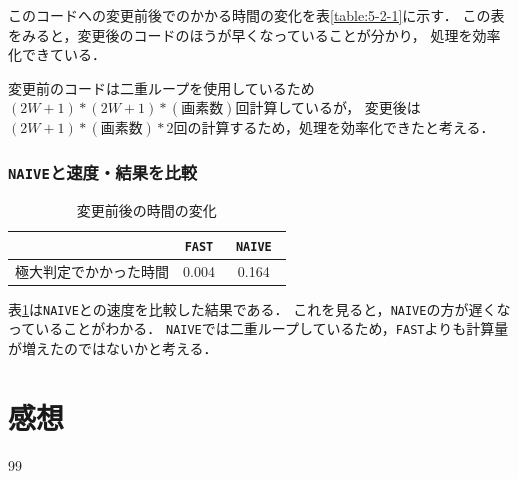 \documentclass[autodetect-engine,dvi=dvipdfmx,ja=standard,
               a4j,11pt]{bxjsarticle}
\begin{document}
このコードへの変更前後でのかかる時間の変化を表\ref{table:5-2-1}に示す．
この表をみると，変更後のコードのほうが早くなっていることが分かり，
処理を効率化できている．

変更前のコードは二重ループを使用しているため$(2W+1)*(2W+1)*(画素数)$回計算しているが，
変更後は$(2W+1)*(画素数)*2$回の計算するため，処理を効率化できたと考える．


\subsubsection{\texttt{NAIVE}と速度・結果を比較}

\begin{table}[htbp]
\centering
\caption{変更前後の時間の変化}\label{table:5-2-2}
\begin{tabular}{|c||c|c|}
\hline
 & \texttt{FAST} & \texttt{NAIVE}　\\
\hline
極大判定でかかった時間 & 0.004 & 0.164 \\
\hline
\end{tabular}\end{table}

表\ref{table:5-2-2}は\verb|NAIVE|との速度を比較した結果である．
これを見ると，\verb|NAIVE|の方が遅くなっていることがわかる．
\verb|NAIVE|では二重ループしているため，\verb|FAST|よりも計算量が増えたのではないかと考える．










\section{感想}


\begin{thebibliography}{99}
\end{thebibliography}

\end{document}
